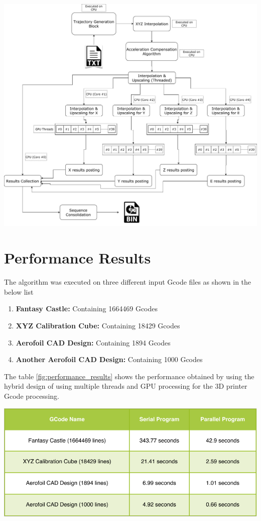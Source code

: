 \documentclass[12pt,letterpaper]{article}
\begin{document}
\begin{center}
   \includegraphics[scale=0.45]{images/parallel-program.pdf}
   \label{fig:parallel_algorithm}
\end{center}

\section{Performance Results}
The algorithm was executed on three different input Gcode files as shown in the below list
\begin{enumerate}
    \item \textbf{Fantasy Castle:} Containing 1664469 Gcodes
    \item \textbf{XYZ Calibration Cube:} Containing 18429 Gcodes
    \item \textbf{Aerofoil CAD Design:} Containing 1894 Gcodes
    \item \textbf{Another Aerofoil CAD Design:} Containing 1000 Gcodes
\end{enumerate}

The table \ref{fig:performance_results} shows the performance obtained by using the hybrid design of using multiple threads and GPU processing for the 3D printer Gcode processing.

\begin{center}
   \includegraphics[scale=1]{images/performance-results.pdf}
   \label{fig:performance_results}
\end{center}
\end{document}
